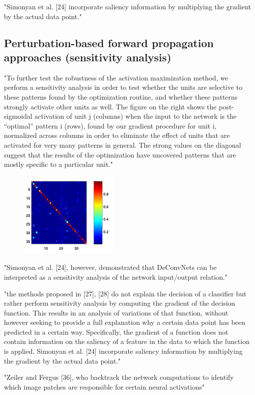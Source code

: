 \documentclass[]{scrartcl}
\begin{document}
"Simonyan et al. [24] incorporate saliency information by multiplying the gradient by the actual data point." \cite{Montavon2017}

\subsection{Perturbation-based forward propagation approaches (sensitivity analysis)}
"To further test the robustness of the activation maximization method, we perform a sensitivity analysis in order to test whether the units are selective to these patterns found by the optimization routine, and whether these patterns strongly activate other units as well. The figure on the right shows the post-sigmoidal activation of unit j (columns) when the input to the network is the “optimal” pattern i (rows), found by our gradient procedure for unit i, normalized across columns in order to eliminate the effect of units that are activated for very many patterns in general. The strong values on the diagonal suggest that the results of the optimization have uncovered patterns that are mostly specific to a particular unit." \cite{Erhan2009}
\begin{figure}[h]
	\centering
	\includegraphics[width=0.2\linewidth]{sensitivity}
\end{figure}

"Simonyan et al. [24], however, demonstrated that DeConvNets can be interpreted as a sensitivity analysis of the network input/output relation." \cite{Mahendran2015}

"the methods proposed in [27], [28] do not explain the decision of a classifier but rather perform sensitivity analysis by computing the gradient of the decision function. This results in an analysis of variations of that function, without however seeking to provide a full explanation why a certain data point has been predicted in a certain way. Specifically, the gradient of a function does not contain information on the saliency of a feature in the data to which the function is applied. Simonyan et al. [24] incorporate saliency information by multiplying the gradient by the actual data point." \cite{Montavon2017}

"Zeiler and Fergus [36], who backtrack the network computations to identify which image patches are responsible for certain neural activations" \cite{Mahendran2015}
\end{document}
